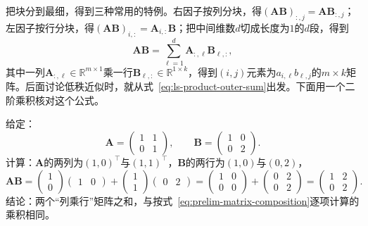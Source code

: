 把块分到最细，得到三种常用的特例。右因子按列分块，得$(\bm A\bm B)_{:,j}=\bm A\bm B_{:,j}$；左因子按行分块，得$(\bm A\bm B)_{i,:}=\bm A_{i,:}\bm B$；把中间维数$d$切成长度为$1$的$d$段，得到
\begin{equation}
 \bm A\bm B=\sum_{\ell=1}^d\bm A_{:,\ell}\bm B_{\ell,:},
 \label{eq:ls-product-outer-sum}
\end{equation}
其中一列$\bm A_{:,\ell}\in\mathbb R^{m\times1}$乘一行$\bm B_{\ell,:}\in\mathbb R^{1\times k}$，得到$(i,j)$元素为$a_{i,\ell}b_{\ell,j}$的$m\times k$矩阵。后面讨论低秩近似时，就从式~\eqref{eq:ls-product-outer-sum}出发。下面用一个二阶乘积核对这个公式。
\begin{example}[把乘积写成列乘行之和]
\label{ex:ls-product-as-outer-sum}
给定：
\[
\bm A=\begin{pmatrix}1&1\\0&1\end{pmatrix},\qquad
\bm B=\begin{pmatrix}1&0\\0&2\end{pmatrix}.
\]
计算：$\bm A$的两列为$(1,0)^\top$与$(1,1)^\top$，$\bm B$的两行为$(1,0)$与$(0,2)$，
\[
 \bm A\bm B=\begin{pmatrix}1\\0\end{pmatrix}\begin{pmatrix}1&0\end{pmatrix}+\begin{pmatrix}1\\1\end{pmatrix}\begin{pmatrix}0&2\end{pmatrix}
 =\begin{pmatrix}1&0\\0&0\end{pmatrix}+\begin{pmatrix}0&2\\0&2\end{pmatrix}=\begin{pmatrix}1&2\\0&2\end{pmatrix}.
\]
结论：两个“列乘行”矩阵之和，与按式~\eqref{eq:prelim-matrix-composition}逐项计算的乘积相同。
\end{example}

